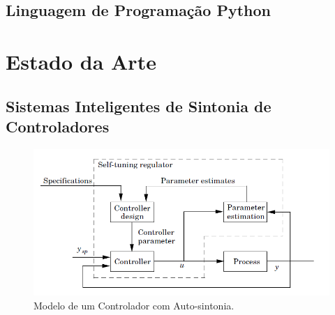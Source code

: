 

\subsection{Linguagem de Programação Python}



\section{Estado da Arte}



\subsection{Sistemas Inteligentes de Sintonia de Controladores}

\begin{figure}[!ht]
  \caption{Modelo de um Controlador com Auto-sintonia.}
  \begin{center}
      \includegraphics[scale=0.75]{img/pid_adaptative_astrom_p233}
  \end{center}
  \label{fig:pid_adaptative_astrom_p233}
\end{figure}

